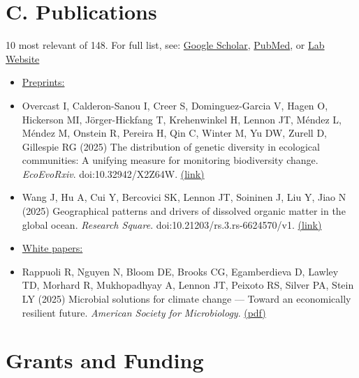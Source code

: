 \documentclass[11pt]{article}  %
\begin{document}
\section*{C. Publications}
10 most relevant of 148. For full list, see: \href{https://scholar.google.com/citations?hl=en&user=d-hWatsAAAAJ}{Google Scholar}, \href{https://www.ncbi.nlm.nih.gov/myncbi/jay.lennon.1/bibliography/public/}{PubMed}, or \href{https://www.ncbi.nlm.nih.gov/myncbi/jay.lennon.1/bibliography/public/}{Lab Website}

\vspace{-0.25em}

\begin{itemize}[leftmargin=*, label={}, itemsep=1em]

  \item[] \textnormal{\underline{Preprints:}}

  \item Overcast I, Calderon-Sanou I, Creer S, Dominguez-Garcia V, Hagen O, Hickerson MI, Jörger-Hickfang T, Krehenwinkel H, Lennon JT, Méndez L, Méndez M, Onstein R, Pereira H, Qin C, Winter M, Yu DW, Zurell D, Gillespie RG (2025) The distribution of genetic diversity in ecological communities: A unifying measure for monitoring biodiversity change. \textit{EcoEvoRxiv}. doi:10.32942/X2Z64W. \href{https://ecoevorxiv.org/repository/view/9169/}{(link)}

  \item Wang J, Hu A, Cui Y, Bercovici SK, Lennon JT, Soininen J, Liu Y, Jiao N (2025) Geographical patterns and drivers of dissolved organic matter in the global ocean. \textit{Research Square}. doi:10.21203/rs.3.rs-6624570/v1. \href{https://assets-eu.researchsquare.com/files/rs-6624570/v1/a75822e6-0649-4c95-919e-3ba016f0bc96.pdf?c=1747022553}{(link)}

  \item[] \textnormal{\underline{White papers:}}

  \item Rappuoli R, Nguyen N, Bloom DE, Brooks CG, Egamberdieva D, Lawley TD, Morhard R, Mukhopadhyay A, Lennon JT, Peixoto RS, Silver PA, Stein LY (2025) Microbial solutions for climate change — Toward an economically resilient future. \textit{American Society for Microbiology}. \href{https://lennonlab.github.io/assets/publications/Rappuoli_etal_2025b.pdf}{(pdf)}

\end{itemize}

\section*{Grants and Funding}
\end{document}
